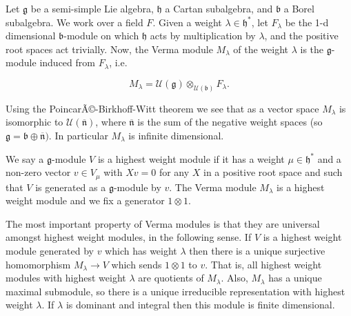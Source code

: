 \documentclass[12pt]{article}
\begin{document}
\newcommand{\fr}[1]{\mathfrak{#1}}
Let $\fr g$ be a semi-simple Lie algebra, $\fr h$ a Cartan subalgebra, and
$\fr b$ a Borel subalgebra.  We work over a field $F$.  Given a weight $\lambda \in \fr h^*$, let $F_{\lambda}$ be the 1-d dimensional $\fr b$-module on which $\fr h$ acts by multiplication by $\lambda$, and the positive root spaces act trivially.  Now, the Verma module $M_\lambda$ of the weight $\lambda$ is the $\fr g$-module induced from $F_\lambda$, i.e.

$$M_\lambda = \mathcal{U}(\fr g) \otimes_{\mathcal{U}(\fr b)} F_\lambda.$$  

Using the PoincarÃ©-Birkhoff-Witt theorem we see that as a vector space $M_\lambda$ is isomorphic to $\mathcal{U}(\overline{\fr n})$, where $\overline{\fr n}$ is the sum of the negative weight spaces (so $\fr g = \fr b \oplus \overline{\fr n})$. In particular $M_\lambda$ is infinite dimensional. 

We say a $\fr g$-module $V$ is a highest weight module if it has a weight $\mu \in \fr h^*$ and a non-zero vector $v \in V_\mu$ with $Xv = 0$ for any $X$ in a positive root space and such that $V$ is generated as a $\fr g$-module by $v$. The Verma module $M_\lambda$ is a highest weight module and we fix a generator $1 \otimes 1$.

The most important property of Verma modules is that they are universal amongst highest weight modules, in the following sense. If $V$ is a highest weight module generated by $v$ which has weight $\lambda$ then there is a unique surjective homomorphism $M_\lambda\to V$ which sends $1 \otimes 1$ to $v$.  That is, all highest weight modules with highest weight $\lambda$ are quotients of $M_\lambda$.  Also, $M_\lambda$ has a unique maximal submodule, so there is a unique irreducible representation with highest weight $\lambda$. If $\lambda$ is dominant and integral then this module is finite dimensional.
\end{document}
